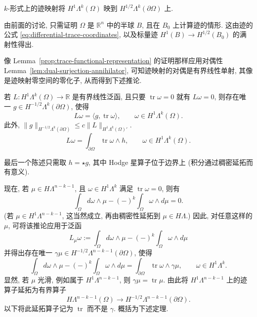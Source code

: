 \begin{Theorem}\label{thm:forms-h1-trace-surjectivity}
{$k$-形式上的迹映射将 $H^1\Lambda^k(\Omega)$ 映到 $H^{1/2}\Lambda^k(\partial\Omega)$ 上.}
\end{Theorem}

\begin{Proof}
{由前面的讨论, 只需证明 $\Omega$ 是 $\mathbb R^n$ 中的半球 $B$, 且在 $B_0$ 上计算迹的情形. 这由迹的公式 \eqref{eq:differential-trace-coordinates}, 以及标量迹 $H^1(B)\to H^{1/2}(B_0)$ 的满射性得出.}
\end{Proof}

{像 Lemma~\ref{prop:trace-functional-representation} 的证明那样应用对偶性 Lemma~\ref{lem:dual-surjection-annihilator}, 可知迹映射的对偶是有界线性单射, 其像是迹映射零空间的零化子, 从而得到下述推论.}

\begin{Corollary}\label{cor:forms-trace-functional-representation}
{若 $L:H^1\Lambda^k(\Omega)\to\mathbb R$ 是有界线性泛函, 且只要 $\operatorname{tr}\omega=0$ 就有 $L\omega=0$, 则存在唯一 $g\in H^{-1/2}\Lambda^k(\partial\Omega)$, 使得}
\[
L\omega=\langle g,\operatorname{tr}\omega\rangle,\qquad\omega\in H^1\Lambda^k(\Omega).
\]
{此外, $\|g\|_{H^{-1/2}\Lambda^k(\partial\Omega)}\leq c\|L\|_{H^1\Lambda^k(\Omega)'}$.}
\[
L\omega=\int_{\partial\Omega}\operatorname{tr}\omega\wedge h,\qquad\omega\in H^1\Lambda^k(\Omega).
\]
\end{Corollary}

{最后一个陈述只需取 $h=\star g$, 其中 Hodge 星算子位于边界上 (积分通过稠密延拓而有意义).}

{现在, 若 $\mu\in H\Lambda^{n-k-1}$, 且 $\omega\in H^1\Lambda^k$ 满足 $\operatorname{tr}\omega=0$, 则有}
\[
\int_\Omega d\omega\wedge\mu-(-)^k\int_\Omega\omega\wedge d\mu=0.
\]
{(若 $\mu\in H^1\Lambda^{n-k-1}$, 这当然成立, 再由稠密性延拓到 $\mu\in H\Lambda$.) 因此, 对任意这样的 $\mu$, 可将该推论应用于泛函}
\[
L_\mu\omega:=\int_\Omega d\omega\wedge\mu-(-)^k\int_\Omega\omega\wedge d\mu
\]
{并得出存在唯一 $\gamma\mu\in H^{-1/2}\Lambda^{n-k-1}(\partial\Omega)$, 使得}
\[
\int_\Omega d\omega\wedge\mu-(-)^k\int_\Omega\omega\wedge d\mu=\int_{\partial\Omega}\operatorname{tr}\omega\wedge\gamma\mu,\qquad\omega\in H^1\Lambda^k.
\]
{显然, 若 $\mu$ 光滑, 例如属于 $H^1\Lambda^{n-k-1}$, 则 $\gamma\mu=\operatorname{tr}\mu$. 由此将 $H^1\Lambda^{n-k-1}$ 上的迹算子延拓为有界算子}
\[
H\Lambda^{n-k-1}(\Omega)\to H^{-1/2}\Lambda^{n-k-1}(\partial\Omega).
\]
{以下将此延拓算子记为 $\operatorname{tr}$ 而不是 $\gamma$. 概括为下述定理.}

